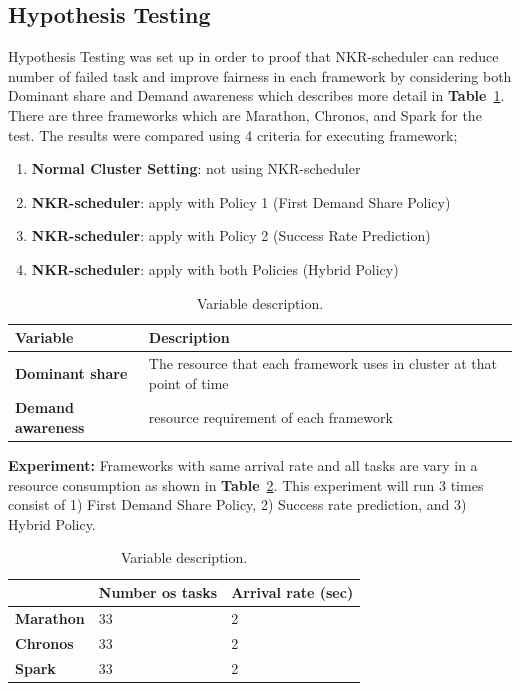 \documentclass[12pt,oneside,openright,a4paper]{cpe-english-project}
\begin{document}
\subsection{Hypothesis Testing} 
\hspace{10mm}Hypothesis Testing was set up in order to proof that NKR-scheduler can reduce number of failed task and improve fairness in each framework by considering both Dominant share and Demand awareness which describes more detail in \textbf{Table}~\ref{tbl:VariableDescription}. There are three frameworks which are Marathon, Chronos, and Spark for the test. The results were compared using 4 criteria for executing framework;
\begin{enumerate}
  \item \textbf{Normal Cluster Setting}: not using NKR-scheduler 
  \item \textbf{NKR-scheduler}: apply with Policy 1 (First Demand Share Policy)
  \item \textbf{NKR-scheduler}: apply with Policy 2 (Success Rate Prediction)
  \item \textbf{NKR-scheduler}: apply with both Policies (Hybrid Policy)
\end{enumerate}

\begin{table}[!h]
  \caption{Variable description.}\label{tbl:VariableDescription}
  \begin{tabular}{@{}|p{}|p{}|}
    \hline
    \textbf{Variable} & \textbf{Description}\\
    \hline
    \textbf{Dominant share} & The resource that each framework uses in cluster at that point of time\\
    \hline
    \textbf{Demand awareness} & resource requirement of each framework \\
    \hline
  \end{tabular}
\end{table}

\textbf{Experiment:} Frameworks with same arrival rate and all tasks are vary in a resource consumption as shown in \textbf{Table}~\ref{tbl:Experiment}. This experiment will run 3 times consist of 1) First Demand Share Policy, 2) Success rate prediction, and 3) Hybrid Policy.

\begin{table}[!h]
  \caption{Variable description.}\label{tbl:Experiment}
  \begin{tabular}{@{}|p{}|p{}|p{}|}
    \hline
    & \textbf{Number os tasks} & \textbf{Arrival rate (sec)}\\
    \hline
    \textbf{Marathon} & 33 & 2\\
    \hline
    \textbf{Chronos} & 33 & 2 \\
    \hline
    \textbf{Spark} & 33 & 2 \\
    \hline
\end{tabular}
\end{table}
\end{document}
